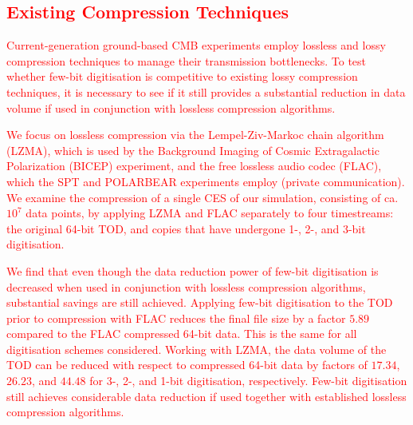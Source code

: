 \documentclass[apj]{emulateapj}
\newcommand{\changed}[1]{\textcolor{Red}{#1}}
\begin{document}


\subsection{\changed{Existing Compression Techniques}}

\changed{Current-generation ground-based CMB experiments employ lossless and lossy compression techniques to manage their transmission bottlenecks. To test whether few-bit digitisation is competitive to existing lossy compression techniques, it is necessary to see if it still provides a substantial reduction in data volume if used in conjunction with lossless compression algorithms.}

\changed{We focus on lossless compression via the Lempel-Ziv-Markoc chain algorithm (LZMA), which is used by the Background Imaging of Cosmic Extragalactic Polarization (BICEP) experiment, and the free lossless audio codec (FLAC), which the SPT and POLARBEAR experiments employ (private communication). We examine the compression of a single CES of our simulation, consisting of ca. $10^7$ data points, by applying LZMA and FLAC separately to four timestreams: the original 64-bit TOD, and copies that have undergone 1-, 2-, and 3-bit digitisation.}

\changed{We find that even though the data reduction power of few-bit digitisation is decreased when used in conjunction with lossless compression algorithms, substantial savings are still achieved. Applying few-bit digitisation to the TOD prior to compression with FLAC reduces the final file size by a factor $5.89$ compared to the FLAC compressed 64-bit data. This is the same for all digitisation schemes considered. Working with LZMA, the data volume of the TOD can be reduced with respect to compressed 64-bit data by factors of $17.34$, $26.23$, and $44.48$ for 3-, 2-, and 1-bit digitisation, respectively. Few-bit digitisation still achieves considerable data reduction if used together with established lossless compression algorithms.}
\end{document}
